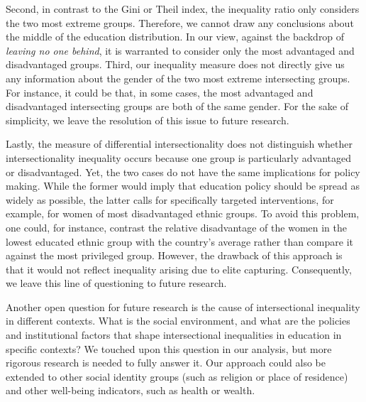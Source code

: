 Second, in contrast to the Gini or Theil index, the inequality ratio only considers the two most extreme groups. Therefore, we cannot draw any conclusions about the middle of the education distribution. In our view, against the backdrop of \textit{leaving no one behind}, it is warranted to consider only the most advantaged and disadvantaged groups. Third, our inequality measure does not directly give us any information about the gender of the two most extreme intersecting groups. For instance, it could be that, in some cases, the most advantaged and disadvantaged intersecting groups are both of the same gender. For the sake of simplicity, we leave the resolution of this issue to future research. 

Lastly, the measure of differential intersectionality does not distinguish whether intersectionality inequality occurs because one group is particularly advantaged or disadvantaged. Yet, the two cases do not have the same implications for policy making. While the former would imply that education policy should be spread as widely as possible, the latter calls for specifically targeted interventions, for example, for women of most disadvantaged ethnic groups. To avoid this problem, one could, for instance, contrast the relative disadvantage of the women in the lowest educated ethnic group with the country's average rather than compare it against the most privileged group. However, the drawback of this approach is that it would not reflect inequality arising due to elite capturing. Consequently, we leave this line of questioning to future research. 

Another open question for future research is the cause of intersectional inequality in different contexts. What is the social environment, and what are the policies and institutional factors that shape intersectional inequalities in education in specific contexts? We touched upon this question in our analysis, but more rigorous research is needed to fully answer it. Our approach could also be extended to other social identity groups (such as religion or place of residence) and other well-being indicators, such as health or wealth.

\clearpage





